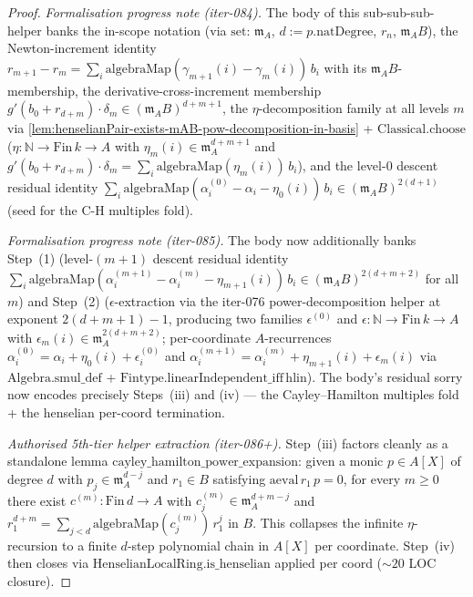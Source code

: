 \begin{proof}
\textit{Formalisation progress note (iter-084).} The body of this
sub-sub-sub-helper banks the in-scope notation (via
$\mathrm{set}$: $\mathfrak m_A$, $d := p.\mathrm{natDegree}$,
$r_n$, $\mathfrak m_A B$), the Newton-increment identity
$r_{m+1} - r_m = \sum_i \mathrm{algebraMap}(\gamma_{m+1}(i) -
\gamma_m(i))\,b_i$ with its $\mathfrak m_A B$-membership, the
derivative-cross-increment membership $g'(b_0 + r_{d+m}) \cdot
\delta_m \in (\mathfrak m_A B)^{d+m+1}$, the $\eta$-decomposition
family at all levels $m$ via
\cref{lem:henselianPair-exists-mAB-pow-decomposition-in-basis} +
$\mathrm{Classical.choose}$ ($\eta : \mathbb N \to \mathrm{Fin}\,k
\to A$ with $\eta_m(i) \in \mathfrak m_A^{d+m+1}$ and $g'(b_0 +
r_{d+m}) \cdot \delta_m = \sum_i \mathrm{algebraMap}
(\eta_m(i))\,b_i$), and the level-$0$ descent residual identity
$\sum_i \mathrm{algebraMap}(\alpha^{(0)}_i - \alpha_i -
\eta_0(i))\,b_i \in (\mathfrak m_A B)^{2(d+1)}$ (seed for the
C-H multiples fold).

\textit{Formalisation progress note (iter-085).} The body now
additionally banks Step~(1) (level-$(m+1)$ descent residual
identity $\sum_i \mathrm{algebraMap}(\alpha^{(m+1)}_i -
\alpha^{(m)}_i - \eta_{m+1}(i))\,b_i \in (\mathfrak m_A
B)^{2(d+m+2)}$ for all $m$) and Step~(2) ($\epsilon$-extraction
via the iter-076 power-decomposition helper at exponent
$2(d+m+1) - 1$, producing two families $\epsilon^{(0)}$ and
$\epsilon : \mathbb N \to \mathrm{Fin}\,k \to A$ with
$\epsilon_m(i) \in \mathfrak m_A^{2(d+m+2)}$; per-coordinate
$A$-recurrences $\alpha^{(0)}_i = \alpha_i + \eta_0(i) +
\epsilon^{(0)}_i$ and $\alpha^{(m+1)}_i = \alpha^{(m)}_i +
\eta_{m+1}(i) + \epsilon_m(i)$ via $\mathrm{Algebra.smul\_def}$
+ $\mathrm{Fintype.linearIndependent\_iff}\,\mathrm{hlin}$).
The body's residual sorry now encodes precisely Steps~(iii) and
(iv) — the Cayley--Hamilton multiples fold + the henselian
per-coord termination.

\textit{Authorised 5th-tier helper extraction (iter-086+).}
Step~(iii) factors cleanly as a standalone lemma
$\mathrm{cayley\_hamilton\_power\_expansion}$: given a monic
$p \in A[X]$ of degree $d$ with $p_j \in \mathfrak
m_A^{d - j}$ and $r_1 \in B$ satisfying
$\mathrm{aeval}\,r_1\,p = 0$, for every $m \ge 0$ there exist
$c^{(m)} : \mathrm{Fin}\,d \to A$ with $c^{(m)}_j \in
\mathfrak m_A^{d + m - j}$ and $r_1^{d + m} = \sum_{j < d}
\mathrm{algebraMap}(c^{(m)}_j)\,r_1^j$ in $B$. This collapses
the infinite $\eta$-recursion to a finite $d$-step polynomial
chain in $A[X]$ per coordinate. Step~(iv) then closes via
$\mathrm{HenselianLocalRing.is\_henselian}$ applied per coord
($\sim 20$ LOC closure).


\end{proof}
